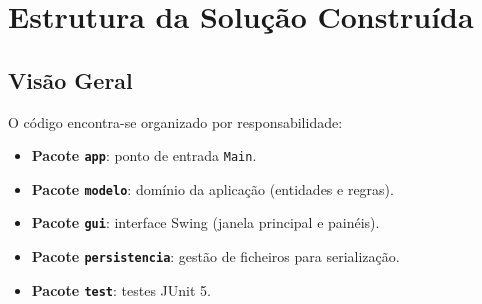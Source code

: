 \documentclass[a4paper,12pt]{article}
\begin{document}
\newpage

\section{Estrutura da Solução Construída}

\subsection{Visão Geral}
O código encontra-se organizado por responsabilidade:
\begin{itemize}
    \item \textbf{Pacote \texttt{app}}: ponto de entrada \texttt{Main}.
    \item \textbf{Pacote \texttt{modelo}}: domínio da aplicação (entidades e regras).
    \item \textbf{Pacote \texttt{gui}}: interface Swing (janela principal e painéis).
    \item \textbf{Pacote \texttt{persistencia}}: gestão de ficheiros para serialização.
    \item \textbf{Pacote \texttt{test}}: testes JUnit 5.
\end{itemize}
\end{document}
